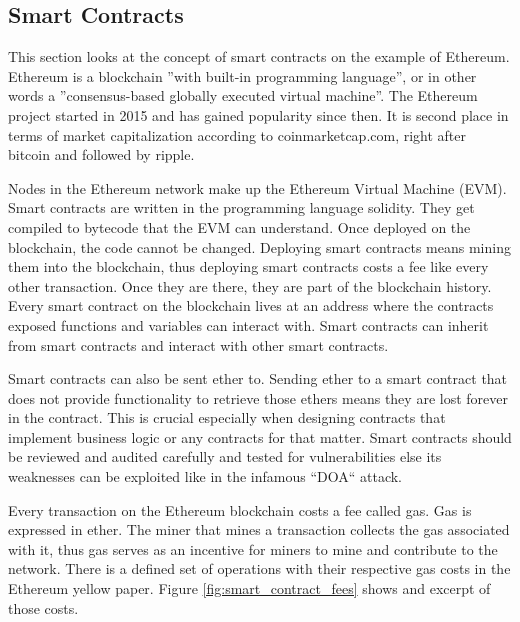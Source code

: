 \subsection{Smart Contracts}
\label{subsec:02_smart_contracts}

This section looks at the concept of smart contracts on the example of Ethereum.
Ethereum is a blockchain ''with built-in programming language'', or in other words a ''consensus-based globally executed virtual machine''.
The Ethereum project started in 2015 and has gained popularity since then. It is second place in terms of market capitalization according to coinmarketcap.com, right after bitcoin and followed by ripple.

Nodes in the Ethereum network make up the Ethereum Virtual Machine (EVM). Smart contracts are written in the programming language solidity. They get compiled to bytecode that the EVM can understand.
Once deployed on the blockchain, the code cannot be changed. Deploying smart contracts means mining them into the blockchain, thus deploying smart contracts costs a fee like every other transaction. Once they are there, they are part of the blockchain history. Every smart contract on the blockchain lives at an address where the contracts exposed functions and variables can interact with. Smart contracts can inherit from smart contracts and interact with other smart contracts.

Smart contracts can also be sent ether to. Sending ether to a smart contract that does not provide functionality to retrieve those ethers means they are lost forever in the contract. This is crucial especially when designing contracts that implement business logic or any contracts for that matter. Smart contracts should be reviewed and audited carefully and tested for vulnerabilities else its weaknesses can be exploited like in the infamous ``DOA`` attack.

Every transaction on the Ethereum blockchain costs a fee called gas. Gas is expressed in ether. The miner that mines a transaction collects the gas associated with it, thus gas serves as an incentive for miners to mine and contribute to the network. There is a defined set of operations with their respective gas costs in the Ethereum yellow paper.
Figure \ref{fig:smart_contract_fees} shows and excerpt of those costs.

